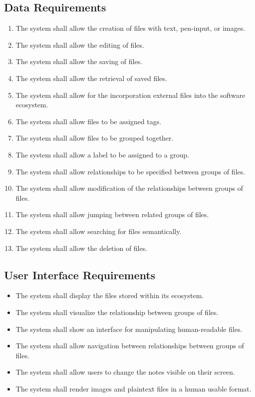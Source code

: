 \documentclass{article}
\begin{document}
\subsection{Data Requirements}
\begin{enumerate}
    \item The system shall allow the creation of files with text, pen-input, or images.
    \item The system shall allow the editing of files.
    \item The system shall allow the saving of files.
    \item The system shall allow the retrieval of saved files.
    \item The system shall allow for the incorporation external files into the software ecosystem.
    \item The system shall allow files to be assigned tags.
    \item The system shall allow files to be grouped together.
    \item The system shall allow a label to be assigned to a group.
    \item The system shall allow relationships to be specified between groups of files.
    \item The system shall allow modification of the relationships between groups of files.
    \item The system shall allow jumping between related groups of files.
    \item The system shall allow searching for files semantically.
    \item The system shall allow the deletion of files.
\end{enumerate}

\subsection{User Interface Requirements}
\begin{itemize}
    \item The system shall display the files stored within its ecosystem.
    \item The system shall visualize the relationship between groups of files.
    \item The system shall show an interface for manipulating human-readable files.
    \item The system shall allow navigation between relationships between groups of files.
    \item The system shall allow users to change the notes visible on their screen.
    \item The system shall render images and plaintext files in a human usable format.
\end{itemize}
\end{document}
